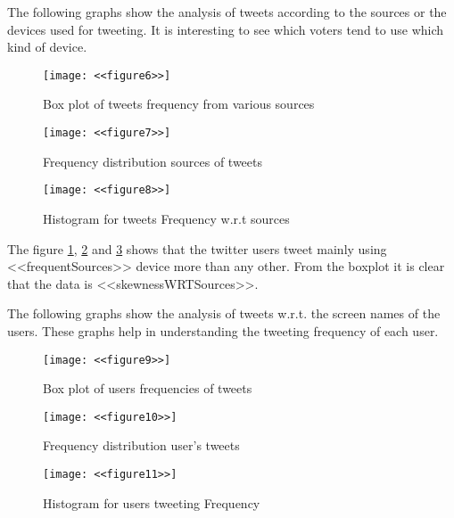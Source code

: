 \documentclass[a4paper,12pt, notitlepage]{article}
\begin{document}
\par
The following graphs show the analysis of tweets according to the sources or the devices used for tweeting. It is interesting to see which voters tend to use which kind of device.

\begin{figure}[!htbp]
    \centering
    \texttt{[image: <<figure6>>]}
    \caption{Box plot of tweets frequency from various sources}
    \label{fig:boxplot2}
\end{figure}

\begin{figure}[!htbp]
    \centering
    \texttt{[image: <<figure7>>]}
    \caption{Frequency distribution sources of tweets}
    \label{fig:vbarplot3}
\end{figure}

\begin{figure}[!htbp]
    \centering
    \texttt{[image: <<figure8>>]}
    \caption{Histogram for tweets Frequency w.r.t sources}
    \label{fig:hist3}
\end{figure}

\par
The figure \ref{fig:boxplot2}, \ref{fig:vbarplot3} and \ref{fig:hist3} shows that the twitter users tweet mainly using <<frequentSources>> device more than any other. From the boxplot it is clear that the data is <<skewnessWRTSources>>.

\par
The following graphs show the analysis of tweets w.r.t. the screen names of the users. These graphs help in understanding the tweeting frequency of each user.

\begin{figure}[!htbp]
    \centering
    \texttt{[image: <<figure9>>]}
    \caption{Box plot of users frequencies of tweets}
    \label{fig:boxplot3}
\end{figure}

\begin{figure}[!htbp]
    \centering
    \texttt{[image: <<figure10>>]}
    \caption{Frequency distribution user's tweets}
    \label{fig:vbarplot4}
\end{figure}

\begin{figure}[!htbp]
    \centering
    \texttt{[image: <<figure11>>]}
    \caption{Histogram for users tweeting Frequency}
    \label{fig:hist4}
\end{figure}
\end{document}
